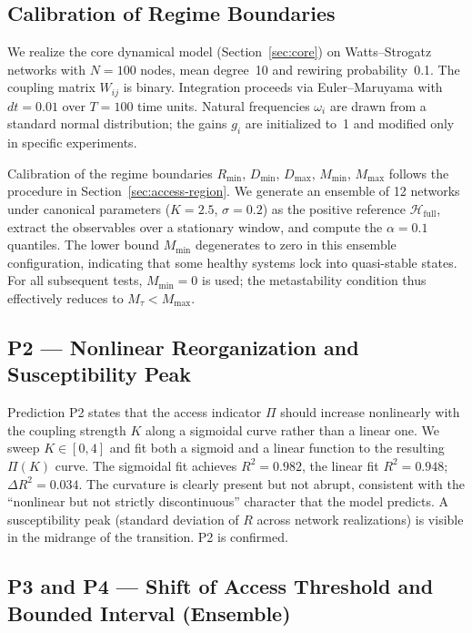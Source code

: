 \documentclass[11pt,a4paper]{article}
\theoremstyle{plain}
\theoremstyle{definition}
\theoremstyle{remark}
\begin{document}
\subsection{Calibration of Regime Boundaries}

We realize the core dynamical model (Section~\ref{sec:core}) on Watts--Strogatz networks with $N = 100$ nodes, mean degree~10 and rewiring probability~0.1. The coupling matrix $W_{ij}$ is binary. Integration proceeds via Euler--Maruyama with $dt = 0.01$ over $T = 100$ time units. Natural frequencies $\omega_i$ are drawn from a standard normal distribution; the gains $g_i$ are initialized to~1 and modified only in specific experiments.

Calibration of the regime boundaries $R_{\min}$, $D_{\min}$, $D_{\max}$, $M_{\min}$, $M_{\max}$ follows the procedure in Section~\ref{sec:access-region}. We generate an ensemble of 12 networks under canonical parameters ($K = 2.5$, $\sigma = 0.2$) as the positive reference $\mathcal{H}_{\mathrm{full}}$, extract the observables over a stationary window, and compute the $\alpha = 0.1$ quantiles. The lower bound $M_{\min}$ degenerates to zero in this ensemble configuration, indicating that some healthy systems lock into quasi-stable states. For all subsequent tests, $M_{\min} = 0$ is used; the metastability condition thus effectively reduces to $M_\tau < M_{\max}$.

\subsection{P2 --- Nonlinear Reorganization and Susceptibility Peak}

Prediction P2 states that the access indicator $\Pi$ should increase nonlinearly with the coupling strength $K$ along a sigmoidal curve rather than a linear one. We sweep $K \in [0, 4]$ and fit both a sigmoid and a linear function to the resulting $\Pi(K)$ curve. The sigmoidal fit achieves $R^2 = 0.982$, the linear fit $R^2 = 0.948$; $\Delta R^2 = 0.034$. The curvature is clearly present but not abrupt, consistent with the ``nonlinear but not strictly discontinuous'' character that the model predicts. A susceptibility peak (standard deviation of $R$ across network realizations) is visible in the midrange of the transition. P2 is confirmed.

\subsection{P3 and P4 --- Shift of Access Threshold and Bounded Interval (Ensemble)}
\end{document}
